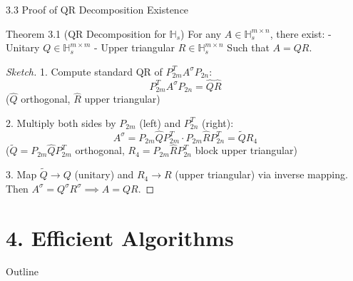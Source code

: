 \documentclass{beamer}
\begin{document}
\begin{frame}{3.3 Proof of QR Decomposition Existence}
  \begin{block}{Theorem 3.1 (QR Decomposition for $\mathbb{H}_s$)}
    For any $A \in \mathbb{H}_s^{m \times n}$, there exist:
    - Unitary $Q \in \mathbb{H}_s^{m \times m}$
    - Upper triangular $R \in \mathbb{H}_s^{m \times n}$
    Such that $A = QR$.
  \end{block}
  
  \begin{proof}[Sketch]
    1. Compute standard QR of $P_{2m}^T A^\sigma P_{2n}$:
       \[
       P_{2m}^T A^\sigma P_{2n} = \hat{Q} \hat{R}
       \]
       ($\hat{Q}$ orthogonal, $\hat{R}$ upper triangular)
    
    2. Multiply both sides by $P_{2m}$ (left) and $P_{2n}^T$ (right):
       \[
       A^\sigma = P_{2m} \hat{Q} P_{2m}^T \cdot P_{2m} \hat{R} P_{2n}^T = \tilde{Q} R_4
       \]
       ($\tilde{Q} = P_{2m} \hat{Q} P_{2m}^T$ orthogonal, $R_4 = P_{2m} \hat{R} P_{2n}^T$ block upper triangular)
    
    3. Map $\tilde{Q} \to Q$ (unitary) and $R_4 \to R$ (upper triangular) via inverse mapping. Then $A^\sigma = Q^\sigma R^\sigma \implies A = QR$.
  \end{proof}
\end{frame}

\section{4. Efficient Algorithms}
\begin{frame}{Outline}
  \tableofcontents[sectionstyle=show/shaded, subsectionstyle=show/show/shaded]
\end{frame}
\end{document}
